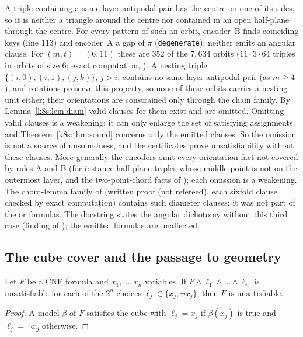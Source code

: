 A triple containing a same-layer antipodal pair has the centre on one of its sides, so it is neither a triangle around
the centre nor contained in an open half-plane through the centre. For every pattern of such an orbit, encoder~B finds
coinciding keys (line 113) and encoder~A a gap of $\pi$ (\texttt{degenerate}); neither emits an angular clause. For
$(m,t)=(6,11)$ these are $352$ of the $7{,}634$ orbits ($11\cdot3\cdot64$ triples in orbits of size $6$; exact
computation, ). A nesting triple $\{(i,0),(i,1),(j,k)\}$, $j>i$, contains no
same-layer antipodal pair (as $m\ge4$), and rotations preserve this property, so none of these orbits carries a nesting
unit either; their orientations are constrained only through the chain family. By Lemma~\ref{k8s:lem:diam} valid
clauses for them exist and are omitted. Omitting valid clauses is a
weakening: it can only enlarge the set of satisfying assignments, and Theorem~\ref{k8s:thm:sound} concerns only the
emitted clauses. So the omission is not a source of unsoundness, and the certificates prove unsatisfiability without
these clauses. More generally the encoders omit every orientation fact not covered by rules A and B (for instance
half-plane triples whose middle point is not on the outermost layer, and the two-point-chord facts of
); each omission is a weakening. The chord-lemma family of  (written proof (not
refereed), each sixfold clause checked by exact computation) contains such diameter clauses; it was not part of the
 or  formulas. The  docstring states the angular dichotomy without this third
case (finding of ); the emitted formulas are unaffected.

\subsection{The cube cover and the passage to geometry}\label{k8s:sec:cube}

\begin{lemma}\label{k8s:lem:cube}
Let $F$ be a CNF formula and $x_1,\dots,x_n$ variables. If $F\wedge\ell_1\wedge\dots\wedge\ell_n$ is unsatisfiable for each of
the $2^n$ choices $\ell_j\in\{x_j,\neg x_j\}$, then $F$ is unsatisfiable.
\end{lemma}

\begin{proof}
A model $\beta$ of $F$ satisfies the cube with $\ell_j=x_j$ if $\beta(x_j)$ is true and $\ell_j=\neg x_j$ otherwise.
\end{proof}

